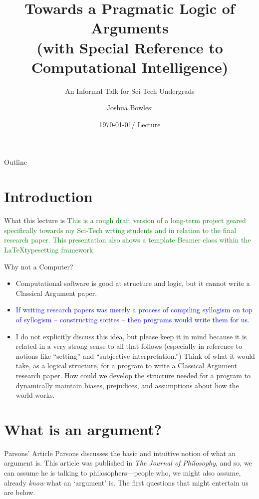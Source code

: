 \documentclass{beamer}
\title[Pragmatic Logic] %
{Towards a Pragmatic Logic of Arguments\\ \small (with Special Reference to Computational Intelligence)}
\subtitle
{An Informal Talk for Sci-Tech Undergrads} %
\author[Joshua Bowles] %
{Joshua Bowles\inst{1}$^,$\inst{2}}
\institute[Utah Valley University] %
{
  \inst{1}%
  Department of English\\
  Utah Valley University
  \and
  \inst{2}%
  Department of Linguistics\\
  University of Utah}
\date[Science and Technical Writing] %
{\today / Lecture}
\begin{document}
\begin{frame}
  \titlepage
\end{frame}

\begin{frame}{Outline}
  \tableofcontents
\end{frame}

\section{Introduction}
\begin{frame}{What this lecture is}
\textcolor{green}{This is a rough draft version of a long-term project geared specifically towards my Sci-Tech wrting students and in relation to the final research paper. This presentation also shows a template Beamer class within the \LaTeX typesetting framework.} 
\end{frame}

\begin{frame}{Why not a Computer?}
\scriptsize 
\begin{itemize}
\item Computational software is good at structure and logic, but it cannot write a Classical Argument paper.
\item \textcolor{blue}{If writing research papers was merely a process of compiling syllogism on top of syllogism -- constructing sorites -- then programs would write them for us.} 
\item I do not explicitly discuss this idea, but please keep it in mind because it is related in a very strong sense to all that follows (especially in reference to notions like ``setting'' and ``subjective interpretation.'') Think of what it would take, as a logical structure, for a program to write a Classical Argument research paper. How could we develop the structure needed for a program to dynamically maintain biases, prejudices, and assumptions about how the world works. 
\end{itemize}
\end{frame}

\section{What is an argument?}
\begin{frame}{Parsons' Article}
Parsons discusses the basic and intuitive notion of what an argument is. This article was published in \textsl{The Journal of Philosophy}, and so, we can assume he is talking to philosophers---people who, we might also assume, already \textsl{know} what an `argument' is. The first questions that might entertain us are below. 
\end{frame} 
\end{document}
